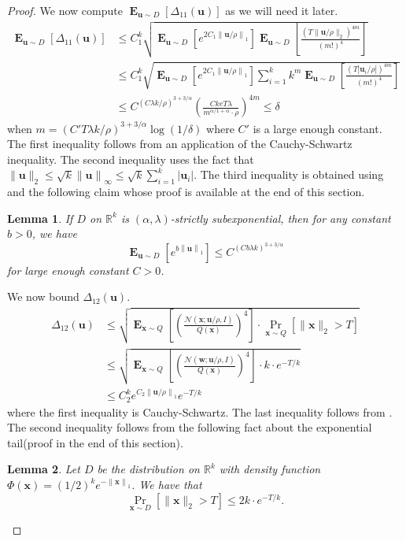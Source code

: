 \documentclass[10pt,a4paper]{article}
\newtheorem{lemma}{Lemma}[section]
\newcommand\twonorm[1]{\|#1\|_2}
\newcommand\norm[1]{\left\| #1 \right\|}
\renewcommand\vec[1]{\mathbf{#1}}
\DeclareMathOperator*{\E}{\mathbf{E}}
\newcommand{\R}{\mathbb{R}}
\newcommand{\1}{\Ind}
\newcommand{\x}{\vec x}
\newcommand{\vu}{\vec u}
\newcommand{\vw}{\vec w}
\newcommand{\Gauss}{\mathcal{N}}
\begin{document}
\begin{proof}
      We now compute $\E_{\vu\sim D}\left[\Delta_{11}(\vu)\right]$ as we will need it later.
      \begin{align*}
        \E_{\vu\sim D}\left[{\Delta_{11}(\vu)}\right]&\leq C_1^{k}\sqrt{\E_{\vu\sim D}\left[e^{2C_1\norm{\vu/\rho}_1}\right]\E_{\vu\sim D}\left[\frac{\left(T\twonorm{\vu/\rho}\right)^{4m}}{(m!)^4} \right]}\\
        &\leq C_1^{k}\sqrt{\E_{\vu\sim D}\left[e^{2C_1\norm{\vu/\rho}_1}\right]\sum_{i=1}^{k}k^{m}\E_{\vu\sim D}\left[\frac{\left(T|{\vu_i/\rho}|\right)^{4m}}{(m!)^4} \right]}\\
        &\leq C^{\left(C\lambda k/\rho\right)^{3+3/\alpha}}\left(\frac{C{k}eT\lambda}{ m^{\alpha/1+\alpha}\cdot \rho}\right)^{4m}
        \leq \delta
      \end{align*}
      when $m= (C'T\lambda k/\rho)^{3+3/\alpha}\log(1/\delta)$ where $C'$ is a large enough constant. The first inequality follows from an application of the Cauchy-Schwartz inequality. The second inequality uses the fact that $\twonorm{\vu}\leq \sqrt{k}\norm{\vu}_{\infty}\leq \sqrt{k}\sum_{i=1}^k|\vu_i|$. The third inequality is obtained using  and the following claim whose proof is available at the end of this section.      
\begin{lemma}
    \label{lem:exp_norm}
    If $D$ on $\R^k$ is $(\alpha,\lambda)$-strictly subexponential, then for any constant $b>0$, we have
    \[
    \E_{\vu\sim D}\left[e^{b\norm{\vu}_1}\right]    \leq C^{\left(Cb\lambda k\right)^{3+3/\alpha} }
    \] for large enough constant $C>0$.
\end{lemma}
      We now bound $\Delta_{12}(\vu)$. 
      \begin{align*}
        \Delta_{12}(\vu)&\leq \sqrt{\E_{\x\sim Q}\left[\left(\frac{\Gauss(\x;\vu/\rho,I)}{Q(\x)}\right)^4\right]\cdot \Pr_{\x\sim Q}[\twonorm{\x}>T]}\\
        &\leq \sqrt{\E_{\x\sim Q}\left[\left(\frac{\Gauss(\vw;\vu/\rho,I)}{Q(\x)}\right)^4\right]\cdot k\cdot  e^{-T/k}}\\
        &\leq C_2^ke^{C_2\norm{\vu/\rho}_1}e^{-T/k}
      \end{align*}
      where the first inequality is Cauchy-Schwartz. The last inequality follows from . The second inequality follows from the following fact about the exponential tail(proof in the end of this section).
\begin{lemma}
\label{lem:exp_tail}
    Let $D$ be the distribution on $\R^k$ with density function $\Phi(\x)=(1/2)^ke^{-\norm{\x}_1}$. We have that \[
        \Pr_{\x\sim D}\left[\twonorm{\x}>T\right]\leq 2k\cdot e^{-T/k}.\]
\end{lemma}


\end{proof}
\end{document}
